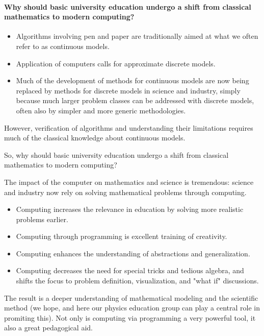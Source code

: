 \documentclass[%
oneside,                 %
final,                   %
10pt]{article}
\begin{document}
\paragraph{Why should basic university education undergo a shift from classical mathematics to modern computing?}
\begin{itemize}
\item Algorithms involving pen and paper are traditionally aimed at what we often refer to as continuous models. 

\item Application of computers calls for approximate discrete models. 

\item Much of the development of methods for continuous models are now being replaced by methods  for discrete models in science and industry, simply because much larger problem classes can be addressed with discrete models, often also by simpler and more generic methodologies. 
\end{itemize}

\noindent
However, verification of algorithms and understanding their limitations requires much 
of the classical knowledge about continuous models.

So, why should basic university education undergo a shift from classical mathematics to modern computing?

The impact of the computer on mathematics and science is tremendous: science and industry now rely on solving mathematical problems through computing.
\begin{itemize}
\item Computing increases the relevance in education by solving more realistic problems earlier.

\item Computing through programming is excellent training of creativity.

\item Computing enhances the understanding of abstractions and generalization.

\item Computing decreases the need for special tricks and tedious algebra, and shifts the focus to problem definition, visualization, and "what if" discussions.
\end{itemize}

\noindent
The result is a deeper understanding of mathematical modeling and the scientific method (we hope, and here our physics education group can play a central role in promiting this). 
Not only is computing via programming a very powerful tool, it also a great pedagogical aid. 
\end{document}

